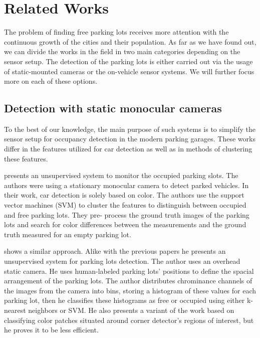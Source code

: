 \chapter{Related Works}
\label{cha:related_works}

The problem of finding free parking lots receives more attention with the
continuous growth of the cities and their population. As far as we have found
out, we can divide the works in the field in two main categories depending on
the sensor setup. The detection of the parking lots is either carried out via
the usage of static-mounted cameras or the on-vehicle sensor systems. We will
further focus more on each of these options.

\section{Detection with static monocular cameras} %
\label{sec:detection_with_monocular_cameras}

To the best of our knowledge, the main purpose of such systems is to simplify
the sensor setup for occupancy detection in the modern parking garages. These
works differ in the features utilized for car detection as well as in methods
of clustering these features.

\citet{qizhang06} presents an unsupervised system to monitor the occupied
parking slots. The authors were using a stationary monocular camera to detect
parked vehicles. In their  work, car detection is solely
based on color. The authors use the support vector machines (SVM) to cluster
the features to distinguish between occupied and free parking lots. They pre-
process the ground truth images of the parking lots and search for color
differences between the measurements and the ground truth measured for an
empty parking lot.

\citet{nicolastrue} shows a similar approach. Alike with the previous papers he
presents an unsupervised system for parking lots detection. The author uses an
overhead static camera. He uses human-labeled parking lots' positions to
define the spacial arrangement of the parking lots. The author distributes
chrominance channels of the images from the camera into bins, storing a
histogram of these values for each parking lot, then he classifies these
histograms as free or occupied using either k-nearest neighbors or SVM\@. He
also presents a variant of the work based on classifying color patches
situated around corner detector's regions of interest, but he proves it to be
less efficient.

